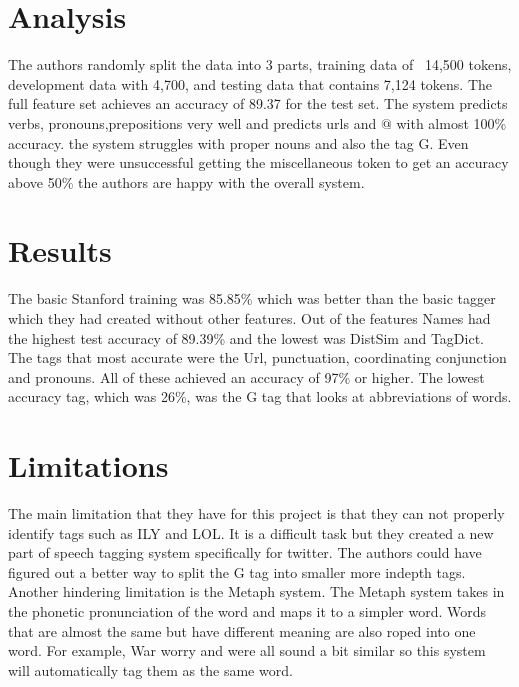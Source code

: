\documentclass[journal, a4paper]{IEEEtran}
\begin{document}
\section{Analysis} 
The authors randomly split the data into 3 parts, training data of ~14,500 tokens, development data with 4,700, and testing data that contains 7,124 tokens. The full feature set achieves an accuracy of 89.37 for the test set. The system predicts verbs, pronouns,prepositions very well and predicts urls and $@$ with almost 100\% accuracy. the system struggles with proper nouns and also the tag G. Even though they were unsuccessful getting the miscellaneous token to get an accuracy above 50\% the authors are happy with the overall system. 


\section{Results}
The basic Stanford training was 85.85\% which was better than the basic tagger which they had created without other features. Out of the features Names had the highest test accuracy of 89.39\% and the lowest was DistSim and TagDict. The tags that most accurate were the Url, punctuation, coordinating conjunction and pronouns. All of these achieved an accuracy of 97\% or higher. The lowest accuracy tag, which was 26\%, was the G tag that looks at abbreviations of words.

\section{Limitations}
The main limitation that they have for this project is that they can not properly identify tags such as ILY and LOL. It is a difficult task but they created a new part of speech tagging system specifically for twitter. The authors could have figured out a better way to split the G tag into smaller more indepth tags. Another hindering limitation is the Metaph system. The Metaph system takes in the phonetic pronunciation of the word and maps it to a simpler word. Words that are almost the same but have different meaning are also roped into one word. For example, War worry and were all sound a bit similar so this system will automatically tag them as the same word.

\end{document}
